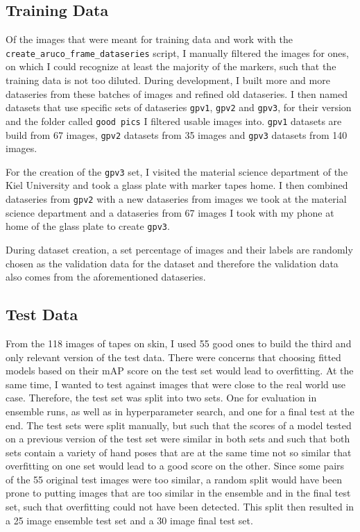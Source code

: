 \documentclass[10pt]{book}
\begin{document}
\subsection{Training Data}

Of the images that were meant for training data and work with the \texttt{create\_aruco\_frame\_dataseries} script, I manually filtered the images for ones, on which I could recognize at least the majority of the markers, such that the training data is not too diluted. During development, I built more and more dataseries from these batches of images and refined old dataseries. I then named datasets that use specific sets of dataseries \texttt{gpv1}, \texttt{gpv2} and \texttt{gpv3}, for their version and the folder called \texttt{good pics} I filtered usable images into. \texttt{gpv1} datasets are build from 67 images, \texttt{gpv2} datasets from 35 images and \texttt{gpv3} datasets from 140 images. 

For the creation of the \texttt{gpv3} set, I visited the material science department of the Kiel University and took a glass plate with marker tapes home. I then combined dataseries from \texttt{gpv2} with a new dataseries from images we took at the material science department and a dataseries from 67 images I took with my phone at home of the glass plate to create \texttt{gpv3}.

During dataset creation, a set percentage of images and their labels are randomly chosen as the validation data for the dataset and therefore the validation data also comes from the aforementioned dataseries.

\subsection{Test Data}

From the 118 images of tapes on skin, I used 55 good ones to build the third and only relevant version of the test data. There were concerns that choosing fitted models based on their \ac{mAP} score on the test set would lead to overfitting. At the same time, I wanted to test against images that were close to the real world use case. Therefore, the test set was split into two sets. One for evaluation in ensemble runs, as well as in hyperparameter search, and one for a final test at the end. The test sets were split manually, but such that the scores of a model tested on a previous version of the test set were similar in both sets and such that both sets contain a variety of hand poses that are at the same time not so similar that overfitting on one set would lead to a good score on the other. Since some pairs of the 55 original test images were too similar, a random split would have been prone to putting images that are too similar in the ensemble and in the final test set, such that overfitting could not have been detected. This split then resulted in a 25 image ensemble test set and a 30 image final test set.
\end{document}
